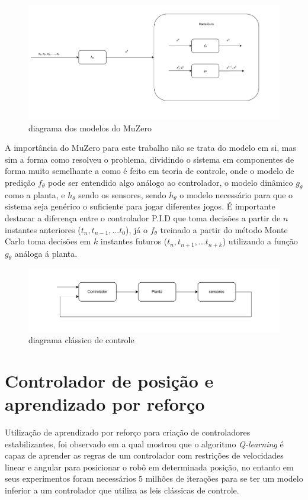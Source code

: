 \begin{figure}[H]
    \centering
    \includegraphics[scale=0.4]{figuras/muzero.pdf}
    \caption{diagrama dos modelos do MuZero}
\end{figure}

A importância do MuZero para este trabalho não se trata do modelo em si,
mas sim a forma como resolveu o problema, dividindo o sistema em componentes
de forma muito semelhante a como é feito em teoria de controle, onde
o modelo de predição  $f_{\theta}$ pode ser entendido algo
análogo ao controlador, o  modelo dinâmico $g_{\theta}$ como a planta,
e $h_{\theta}$ sendo os sensores, sendo $h_{\theta}$ o modelo
necessário  para que o sistema seja genérico o suficiente para jogar
diferentes jogos. É importante destacar a diferença entre o controlador P.I.D
que toma decisões a partir de $n$ instantes anteriores ($t_n,t_{n-1},...t_{0}$),
já o $f_{\theta}$
treinado a partir do método Monte Carlo toma decisões em $k$ instantes futuros ($t_n,t_{n+1},...t_{n+k}$)
utilizando a função $g_{\theta}$ análoga á planta.

\begin{figure}[H]
    \centering
    \includegraphics[scale=0.6]{figuras/sistema_classico_controle.pdf}
    \caption{diagrama clássico de controle}
\end{figure}

\section{Controlador de posição e aprendizado por reforço }
\label{sec:controlador:posicao:aprendizado:reforco}
Utilização de aprendizado por reforço para criação de controladores
estabilizantes, foi observado em \cite{farias2020position}
a qual mostrou que o algoritmo \textit{Q-learning} é capaz de aprender
as regras de um controlador com restrições de velocidades linear e angular
para  posicionar o robô em determinada posição, no entanto em seus
experimentos foram necessários 5 milhões de iterações para se ter um modelo
inferior a um controlador que utiliza as leis clássicas de controle.

